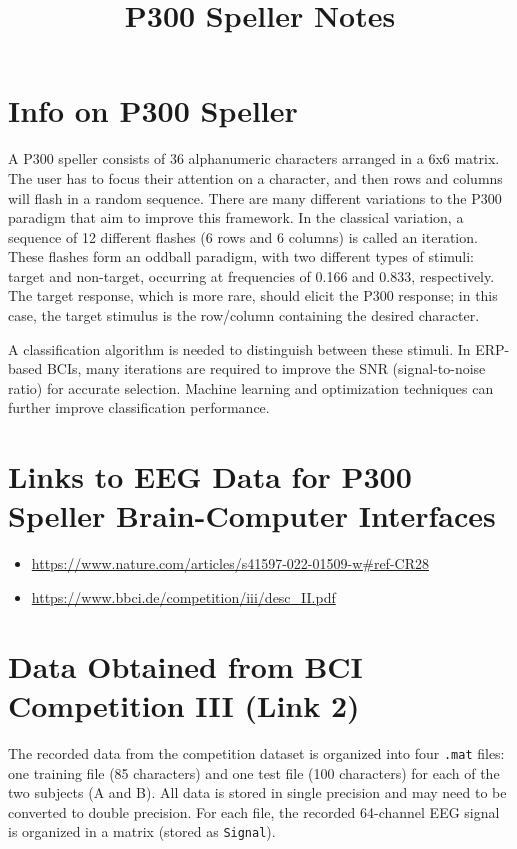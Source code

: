 \documentclass{article}
\title{P300 Speller Notes}
\author{}
\date{}
\begin{document}
\maketitle

\section{Info on P300 Speller}
A P300 speller consists of 36 alphanumeric characters arranged in a 6x6 matrix. The user has to focus their attention on a character, and then rows and columns will flash in a random sequence. There are many different variations to the P300 paradigm that aim to improve this framework. In the classical variation, a sequence of 12 different flashes (6 rows and 6 columns) is called an iteration. These flashes form an oddball paradigm, with two different types of stimuli: target and non-target, occurring at frequencies of 0.166 and 0.833, respectively. The target response, which is more rare, should elicit the P300 response; in this case, the target stimulus is the row/column containing the desired character. 

A classification algorithm is needed to distinguish between these stimuli. In ERP-based BCIs, many iterations are required to improve the SNR (signal-to-noise ratio) for accurate selection. Machine learning and optimization techniques can further improve classification performance.

\section{Links to EEG Data for P300 Speller Brain-Computer Interfaces}
\begin{itemize}
    \item \url{https://www.nature.com/articles/s41597-022-01509-w#ref-CR28}
    \item \url{https://www.bbci.de/competition/iii/desc_II.pdf}
\end{itemize}

\section{Data Obtained from BCI Competition III (Link 2)}
The recorded data from the competition dataset is organized into four \texttt{.mat} files: one training file (85 characters) and one test file (100 characters) for each of the two subjects (A and B). All data is stored in single precision and may need to be converted to double precision. For each file, the recorded 64-channel EEG signal is organized in a matrix (stored as \texttt{Signal}). 
\end{document}

